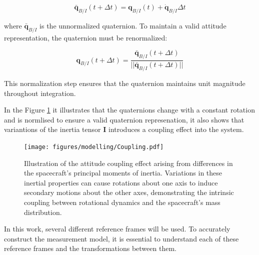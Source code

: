 \begin{equation}
\bar{\mathbf{q}}_{B/I}(t + \Delta t) = \mathbf{q}_{B/I}(t) + \dot{\mathbf{q}}_{B/I} \Delta t
\end{equation}

\noindent where $\bar{\mathbf{q}}_{B/I}$ is the unnormalized quaternion. To maintain a valid attitude representation, the quaternion must be renormalized:

\begin{equation}
\mathbf{q}_{B/I}(t + \Delta t) = \frac{\bar{\mathbf{q}}_{B/I}(t + \Delta t)}{||\bar{\mathbf{q}}_{B/I}(t + \Delta t)||}
\end{equation}

\noindent This normalization step ensures that the quaternion maintains unit magnitude throughout integration.
\vspace{0.5cm}

\noindent
In the Figure \ref{fig:Coupling} it illustrates that the quaternions change with a constant rotation and is normlised to ensure a valid quaternion represenation, it also shows that variantions of the inertia tensor $\mathbf{I}$ introduces a coupling effect into the system.

\begin{figure}[H]
    \centering
    \texttt{[image: figures/modelling/Coupling.pdf]}
    \caption{Illustration of the attitude coupling effect arising from differences in the spacecraft's principal moments of inertia. Variations in these inertial properties can cause rotations about one axis to induce secondary motions about the other axes, demonstrating the intrinsic coupling between rotational dynamics and the spacecraft's mass distribution.}
    \label{fig:Coupling}
\end{figure}



In this work, several different reference frames will be used. To accurately construct the measurement model, it is 
essential to understand each of these reference frames and the transformations between them.


